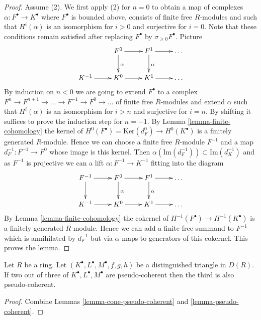 \begin{proof}
\medskip\noindent
Assume (2). We first apply (2) for $n = 0$ to obtain a
map of complexes $\alpha : F^\bullet \to K^\bullet$ where $F^\bullet$ is
bounded above, consists of finite free $R$-modules and such that
$H^i(\alpha)$ is an isomorphism for $i > 0$ and surjective for $i = 0$.
Note that these conditions remain satisfied after replacing $F^\bullet$
by $\sigma_{\geq 0}F^\bullet$. Picture
$$
\xymatrix{
& F^0 \ar[r] \ar[d]^\alpha & F^1 \ar[d]^\alpha \ar[r] & \ldots \\
K^{-1} \ar[r] & K^0 \ar[r] & K^1 \ar[r] & \ldots
}
$$
By induction on $n < 0$ we are going to extend $F^\bullet$ to a complex
$F^n \to F^{n + 1} \to \ldots \to F^{-1} \to F^0 \to \ldots$
of finite free $R$-modules and extend $\alpha$ such that $H^i(\alpha)$
is an isomorphism for $i > n$ and surjective for $i = n$.
By shifting it suffices to prove the induction step for $n = -1$.
By
Lemma \ref{lemma-finite-cohomology}
the kernel of $H^0(F^\bullet) = \text{Ker}(d_F^0) \to H^0(K^\bullet)$
is a finitely generated $R$-module. Hence we can choose a finite free
$R$-module $F^{-1}$ and a map $d_F^{-1} : F^{-1} \to F^0$ whose image
is this kernel. Then $\alpha(\text{Im}(d_F^{-1})) \subset
\text{Im}(d_K^{-1})$ and as $F^{-1}$ is projective we can a lift
$\alpha : F^{-1} \to K^{-1}$ fitting into the diagram
$$
\xymatrix{
F^{-1} \ar[d] \ar[r] &
F^0 \ar[r] \ar[d]^\alpha &
F^1 \ar[d]^\alpha \ar[r] & \ldots \\
K^{-1} \ar[r] & K^0 \ar[r] & K^1 \ar[r] & \ldots
}
$$
By
Lemma \ref{lemma-finite-cohomology}
the cokernel of $H^{-1}(F^\bullet) \to H^{-1}(K^\bullet)$
is a finitely generated $R$-module. Hence we can add a finite free
summand to $F^{-1}$ which is annihilated by $d_F^{-1}$ but
via $\alpha$ maps to generators of this cokernel.
This proves the lemma.
\end{proof}

\begin{lemma}
\label{lemma-two-out-of-three-pseudo-coherent}
Let $R$ be a ring. Let $(K^\bullet, L^\bullet, M^\bullet, f, g, h)$
be a distinguished triangle in $D(R)$. If two out of three of
$K^\bullet, L^\bullet, M^\bullet$ are
pseudo-coherent then the third is also pseudo-coherent.
\end{lemma}

\begin{proof}
Combine
Lemmas \ref{lemma-cone-pseudo-coherent} and \ref{lemma-pseudo-coherent}.
\end{proof}


